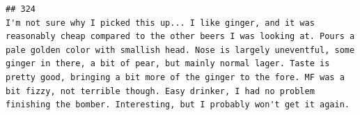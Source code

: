 \documentclass[
  a4paper,
]{article}
\begin{document}
\begin{verbatim}
## 324                                                                                                                                                                                                                                                                                                                                                                                                                                                                                                                                                                                                                                                                                                                                                                                                                                                                                                                                                                                                                                                                                                                                                                                                                                                                                                                                                                                                                                                                                                                                                                                                                                                              I'm not sure why I picked this up... I like ginger, and it was reasonably cheap compared to the other beers I was looking at. Pours a pale golden color with smallish head. Nose is largely uneventful, some ginger in there, a bit of pear, but mainly normal lager. Taste is pretty good, bringing a bit more of the ginger to the fore. MF was a bit fizzy, not terrible though. Easy drinker, I had no problem finishing the bomber. Interesting, but I probably won't get it again.

\end{verbatim}
\end{document}
